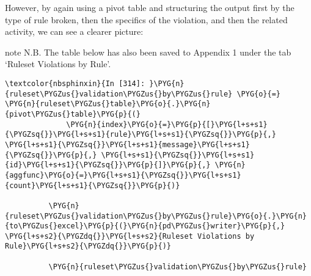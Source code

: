 \documentclass[letterpaper,10pt,english]{sphinxmanual}
\newenvironment{notice}{\begin{sphinxadmonition}}{\end{sphinxadmonition}}%
\begin{document}
However, by again using a pivot table and structuring the output first
by the type of rule broken, then the specifics of the violation, and
then the related activity, we can see a clearer picture:

\begin{notice}{note}{}\unskip
N.B. The table below has also been saved to Appendix 1 under the tab
`Ruleset Violations by Rule'.
\end{notice}

\begin{Verbatim}[commandchars=\\\{\}]
\textcolor{nbsphinxin}{In [314]: }\PYG{n}{ruleset\PYGZus{}validation\PYGZus{}by\PYGZus{}rule} \PYG{o}{=} \PYG{n}{ruleset\PYGZus{}table}\PYG{o}{.}\PYG{n}{pivot\PYGZus{}table}\PYG{p}{(}
              \PYG{n}{index}\PYG{o}{=}\PYG{p}{[}\PYG{l+s+s1}{\PYGZsq{}}\PYG{l+s+s1}{rule}\PYG{l+s+s1}{\PYGZsq{}}\PYG{p}{,} \PYG{l+s+s1}{\PYGZsq{}}\PYG{l+s+s1}{message}\PYG{l+s+s1}{\PYGZsq{}}\PYG{p}{,} \PYG{l+s+s1}{\PYGZsq{}}\PYG{l+s+s1}{id}\PYG{l+s+s1}{\PYGZsq{}}\PYG{p}{]}\PYG{p}{,} \PYG{n}{aggfunc}\PYG{o}{=}\PYG{l+s+s1}{\PYGZsq{}}\PYG{l+s+s1}{count}\PYG{l+s+s1}{\PYGZsq{}}\PYG{p}{)}
          
          \PYG{n}{ruleset\PYGZus{}validation\PYGZus{}by\PYGZus{}rule}\PYG{o}{.}\PYG{n}{to\PYGZus{}excel}\PYG{p}{(}\PYG{n}{pd\PYGZus{}writer}\PYG{p}{,} \PYG{l+s+s2}{\PYGZdq{}}\PYG{l+s+s2}{Ruleset Violations by Rule}\PYG{l+s+s2}{\PYGZdq{}}\PYG{p}{)}
          
          \PYG{n}{ruleset\PYGZus{}validation\PYGZus{}by\PYGZus{}rule}
\end{Verbatim}
\end{document}
